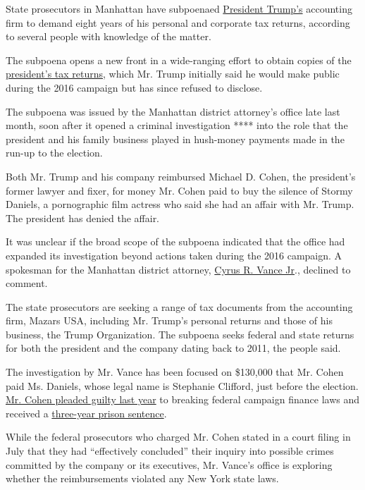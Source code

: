 State prosecutors in Manhattan have subpoenaed
\href{https://www.nytimes.com/2020/07/10/nyregion/donald-trump-taxes-cy-vance.html}{President
Trump's} accounting firm to demand eight years of his personal and
corporate tax returns, according to several people with knowledge of the
matter.

The subpoena opens a new front in a wide-ranging effort to obtain copies
of the
\href{https://www.nytimes.com/2020/07/15/nyregion/donald-trump-taxes-cyrus-vance.html}{president's
tax returns}, which Mr. Trump initially said he would make public during
the 2016 campaign but has since refused to disclose.

The subpoena was issued by the Manhattan district attorney's office late
last month, soon after it opened a criminal investigation **** into the
role that the president and his family business played in hush-money
payments made in the run-up to the election.

Both Mr. Trump and his company reimbursed Michael D. Cohen, the
president's former lawyer and fixer, for money Mr. Cohen paid to buy the
silence of Stormy Daniels, a pornographic film actress who said she had
an affair with Mr. Trump. The president has denied the affair.

It was unclear if the broad scope of the subpoena indicated that the
office had expanded its investigation beyond actions taken during the
2016 campaign. A spokesman for the Manhattan district attorney,
\href{https://www.nytimes.com/2020/07/10/nyregion/donald-trump-taxes-cy-vance.html}{Cyrus
R. Vance Jr}., declined to comment.

The state prosecutors are seeking a range of tax documents from the
accounting firm, Mazars USA, including Mr. Trump's personal returns and
those of his business, the Trump Organization. The subpoena seeks
federal and state returns for both the president and the company dating
back to 2011, the people said.

The investigation by Mr. Vance has been focused on \$130,000 that Mr.
Cohen paid Ms. Daniels, whose legal name is Stephanie Clifford, just
before the election.
\href{https://www.nytimes.com/2018/08/21/nyregion/michael-cohen-plea-deal-trump.html}{Mr.
Cohen pleaded guilty last year} to breaking federal campaign finance
laws and received a
\href{https://www.nytimes.com/2018/12/12/nyregion/michael-cohen-sentence-trump.html}{three-year
prison sentence}.

While the federal prosecutors who charged Mr. Cohen stated in a court
filing in July that they had ``effectively concluded'' their inquiry
into possible crimes committed by the company or its executives, Mr.
Vance's office is exploring whether the reimbursements violated any New
York state laws.

